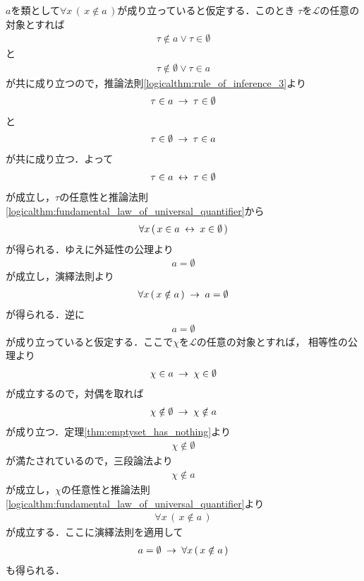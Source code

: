	\begin{prf}
		$a$を類として$\forall x\, (\, x \notin a\, )$が成り立っていると仮定する．このとき
		$\tau$を$\mathcal{L}$の任意の対象とすれば
		\begin{align}
			\tau \notin a \vee \tau \in \emptyset
		\end{align}
		と
		\begin{align}
			\tau \notin \emptyset \vee \tau \in a
		\end{align}
		が共に成り立つので，推論法則\ref{logicalthm:rule_of_inference_3}より
		\begin{align}
			\tau \in a \hspace{0.25em}\rightarrow\hspace{0.25em} \tau \in \emptyset
		\end{align}
		と
		\begin{align}
			\tau \in \emptyset \hspace{0.25em}\rightarrow\hspace{0.25em} \tau \in a
		\end{align}
		が共に成り立つ．よって
		\begin{align}
			\tau \in a \hspace{0.25em}\leftrightarrow\hspace{0.25em} \tau \in \emptyset
		\end{align}
		が成立し，$\tau$の任意性と推論法則\ref{logicalthm:fundamental_law_of_universal_quantifier}から
		\begin{align}
			\forall x\, (\, x \in a \hspace{0.25em}\leftrightarrow\hspace{0.25em} x \in \emptyset\, )
		\end{align}
		が得られる．ゆえに外延性の公理より
		\begin{align}
			a = \emptyset
		\end{align}
		が成立し，演繹法則より
		\begin{align}
			\forall x\, (\, x \notin a\, ) \hspace{0.25em}\rightarrow\hspace{0.25em} a = \emptyset
		\end{align}
		が得られる．逆に
		\begin{align}
			a = \emptyset
		\end{align}
		が成り立っていると仮定する．ここで$\chi$を$\mathcal{L}$の任意の対象とすれば，
		相等性の公理より
		\begin{align}
			\chi \in a \hspace{0.25em}\rightarrow\hspace{0.25em} \chi \in \emptyset
		\end{align}
		が成立するので，対偶を取れば
		\begin{align}
			\chi \notin \emptyset \hspace{0.25em}\rightarrow\hspace{0.25em} \chi \notin a
		\end{align}
		が成り立つ．定理\ref{thm:emptyset_has_nothing}より
		\begin{align}
			\chi \notin \emptyset
		\end{align}
		が満たされているので，三段論法より
		\begin{align}
			\chi \notin a
		\end{align}
		が成立し，$\chi$の任意性と推論法則\ref{logicalthm:fundamental_law_of_universal_quantifier}より
		\begin{align}
			\forall x\, (\, x \notin a\, )
		\end{align}
		が成立する．ここに演繹法則を適用して
		\begin{align}
			a = \emptyset \hspace{0.25em}\rightarrow\hspace{0.25em} \forall x\, (\, x \notin a\, )
		\end{align}
		も得られる．
		\QED
	\end{prf}
	
